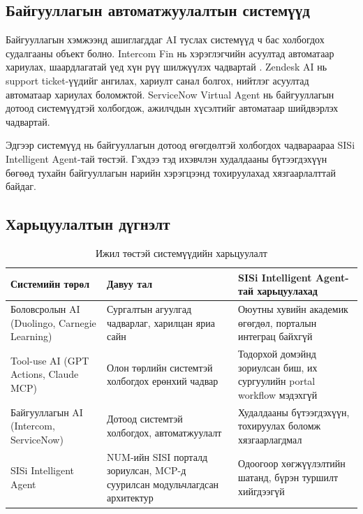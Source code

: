 \subsection{Байгууллагын автоматжуулалтын системүүд}

Байгууллагын хэмжээнд ашиглагддаг AI туслах системүүд ч бас холбогдох судалгааны объект болно. Intercom Fin нь хэрэглэгчийн асуултад автоматаар хариулах, шаардлагатай үед хүн рүү шилжүүлэх чадвартай \citep{intercom-fin}. Zendesk AI нь support ticket-үүдийг ангилах, хариулт санал болгох, нийтлэг асуултад автоматаар хариулах боломжтой. ServiceNow Virtual Agent нь байгууллагын дотоод системүүдтэй холбогдож, ажилчдын хүсэлтийг автоматаар шийдвэрлэх чадвартай.

Эдгээр системүүд нь байгууллагын дотоод өгөгдөлтэй холбогдох чадвараараа SISi Intelligent Agent-тай төстэй. Гэхдээ тэд ихэвчлэн худалдааны бүтээгдэхүүн бөгөөд тухайн байгууллагын нарийн хэрэгцээнд тохируулахад хязгаарлалттай байдаг.

\subsection{Харьцуулалтын дүгнэлт}

\begin{table}[H]
  \centering
  \caption{Ижил төстэй системүүдийн харьцуулалт}
  \label{tab:similar-systems}
  \begin{tabularx}{\textwidth}{>{\raggedright\arraybackslash}p{3cm} >{\raggedright\arraybackslash}X >{\raggedright\arraybackslash}X}
    \toprule
    Системийн төрөл & Давуу тал & SISi Intelligent Agent-тай харьцуулахад \\
    \midrule
    Боловсролын AI (Duolingo, Carnegie Learning) & Сургалтын агуулгад чадварлаг, харилцан яриа сайн & Оюутны хувийн академик өгөгдөл, порталын интеграц байхгүй \\
    \addlinespace
    Tool-use AI (GPT Actions, Claude MCP) & Олон төрлийн системтэй холбогдох ерөнхий чадвар & Тодорхой домэйнд зориулсан биш, их сургуулийн portal workflow мэдэхгүй \\
    \addlinespace
    Байгууллагын AI (Intercom, ServiceNow) & Дотоод системтэй холбогдох, автоматжуулалт & Худалдааны бүтээгдэхүүн, тохируулах боломж хязгаарлагдмал \\
    \addlinespace
    SISi Intelligent Agent & NUM-ийн SISI порталд зориулсан, MCP-д суурилсан модульчлагдсан архитектур & Одоогоор хөгжүүлэлтийн шатанд, бүрэн туршилт хийгдээгүй \\
    \bottomrule
  \end{tabularx}
\end{table}

